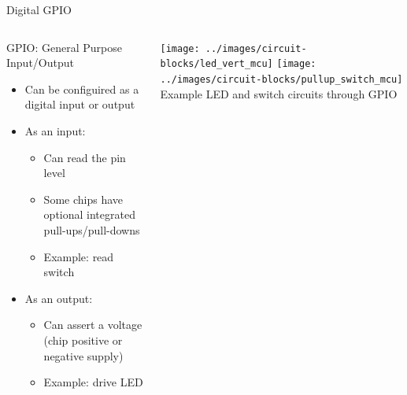 \documentclass{beamer}
\begin{document}
\begin{frame}{Digital GPIO}
  \begin{columns}[T]
    \begin{column}{.6\textwidth}
      GPIO: General Purpose Input/Output
      \begin{itemize}
        \item Can be configuired as a digital input or output
        \item As an input:
        \begin{itemize}
          \item Can read the pin level
          \item Some chips have optional integrated pull-ups/pull-downs
          \item Example: read switch
        \end{itemize}
        \item As an output:
        \begin{itemize}
          \item Can assert a voltage (chip positive or negative supply)
          \item Example: drive LED
        \end{itemize}
      \end{itemize}
    \end{column}

    \begin{column}{0.4\textwidth} \centering
      \texttt{[image: ../images/circuit-blocks/led\_vert\_mcu]}
      \texttt{[image: ../images/circuit-blocks/pullup\_switch\_mcu]} \\
      Example LED and switch circuits through GPIO
    \end{column}
  \end{columns}
\end{frame}
\end{document}

